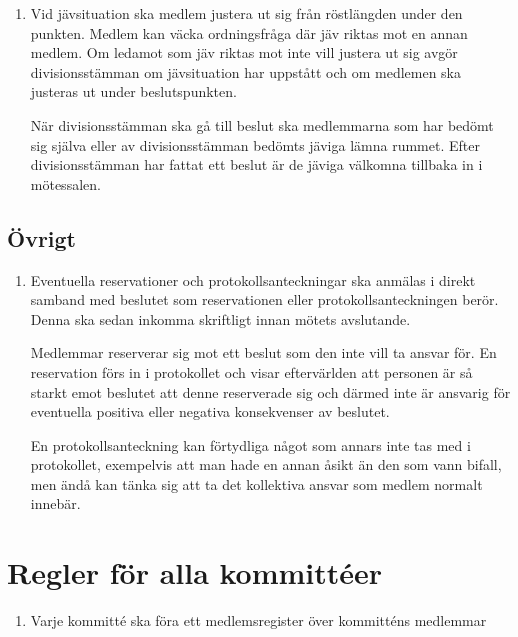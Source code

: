 \documentclass{dvd}
\begin{document}
	\begin{enumerate}[label=\arabic* §, ref=\arabic*]
		\item Vid jävsituation ska medlem justera ut sig från röstlängden under den punkten.
		Medlem kan väcka ordningsfråga där jäv riktas mot en annan medlem.
		Om ledamot som jäv riktas mot inte vill justera ut sig avgör divisionsstämman om jävsituation har uppstått och om medlemen ska justeras ut under beslutspunkten.

		När divisionsstämman ska gå till beslut ska medlemmarna som har bedömt sig själva eller av divisionsstämman bedömts jäviga lämna rummet.
		Efter divisionsstämman har fattat ett beslut är de jäviga välkomna tillbaka in i mötessalen.
	\end{enumerate}

	\subsection{Övrigt}

	\begin{enumerate}[label=\arabic* §, ref=\arabic*]
		\item Eventuella reservationer och protokollsanteckningar ska anmälas i direkt samband med beslutet som reservationen eller protokollsanteckningen berör.
		Denna ska sedan inkomma skriftligt innan mötets avslutande.

		Medlemmar reserverar sig mot ett beslut som den inte vill ta ansvar för.
		En reservation förs in i protokollet och visar eftervärlden att personen är så starkt emot beslutet att denne reserverade sig och därmed inte är ansvarig för eventuella positiva eller negativa konsekvenser av beslutet.

		En protokollsanteckning kan förtydliga något som annars inte tas med i protokollet, exempelvis att man hade en annan åsikt än den som vann bifall, men ändå kan tänka sig att ta det kollektiva ansvar som medlem normalt innebär.
	\end{enumerate}

\section{Regler för alla kommittéer}

	\begin{enumerate}[label=\arabic* §, ref=\arabic*]
		\item Varje kommitté ska föra ett medlemsregister över kommitténs medlemmar


	\end{enumerate}
\end{document}
